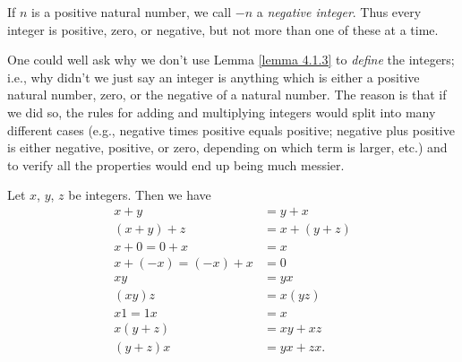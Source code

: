If \(n\) is a positive natural number, we call \(-n\) a \emph{negative integer}.
Thus every integer is positive, zero, or negative, but not more than one of these at a time.

One could well ask why we don’t use Lemma \ref{lemma 4.1.3} to \emph{define} the integers;
i.e., why didn’t we just say an integer is anything which is either a positive natural number, zero, or the negative of a natural number.
The reason is that if we did so, the rules for adding and multiplying integers would split into many different cases (e.g., negative times positive equals positive; negative plus positive is either negative, positive, or zero, depending on which term is larger, etc.) and to verify all the properties would end up being much messier.

\begin{proposition}\label{proposition 4.1.1}
Let \(x\), \(y\), \(z\) be integers.
Then we have
\begin{align*}
    x + y &= y + x \\
    (x + y) + z &= x + (y + z) \\
    x + 0 = 0 + x &= x \\
    x + (-x) = (-x) + x &= 0 \\
    xy &= yx \\
    (xy)z &= x(yz) \\
    x1 = 1x &= x \\
    x(y + z) &= xy + xz \\
    (y + z)x &= yx + zx.
\end{align*}
\end{proposition}

